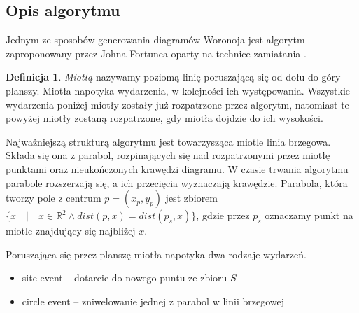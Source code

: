 \documentclass[declaration,shortabstract, inz]{iithesis}
\theoremstyle{definition} \newtheorem{definition}{Definicja}[]
\theoremstyle{plain} \newtheorem{remark}[definition]{Obserwacja}
\theoremstyle{plain} \newtheorem{theorem}[definition]{Twierdzenie}
\theoremstyle{plain} \newtheorem{example}{Przykład}[definition]
\theoremstyle{plain} \newtheorem{lemma}[definition]{Lemat}
\begin{document}
\subsection{Opis algorytmu}
Jednym ze sposobów  generowania diagramów Woronoja jest algorytm zaproponowany przez Johna Fortunea oparty na technice zamiatania \cite{miotla}. 

\begin{definition}
\textit{Miotłą} nazywamy poziomą linię poruszającą się od dołu do góry planszy. Miotła napotyka wydarzenia, w kolejności ich występowania. Wszystkie wydarzenia poniżej miotły zostały już rozpatrzone przez algorytm, natomiast te powyżej miotły zostaną rozpatrzone, gdy miotła dojdzie do ich wysokości.
\end{definition}

Najważniejszą strukturą algorytmu jest towarzysząca miotle linia brzegowa. Składa się ona z parabol, rozpinających się nad rozpatrzonymi przez miotłę punktami oraz nieukończonych krawędzi diagramu. W czasie trwania algorytmu parabole rozszerzają się, a ich przecięcia wyznaczają krawędzie. Parabola, która tworzy pole z centrum $p = (x_p, y_p)$ jest zbiorem $\{ x \quad | \quad x \in \mathbb{R}^2 \land dist(p, x) = dist(p_s, x) \}$, gdzie przez $p_s$ oznaczamy punkt na miotle znajdujący się najbliżej $x$. 

Poruszająca się przez planszę miotła napotyka dwa rodzaje wydarzeń.

\begin{itemize}
	\item site event -- dotarcie do nowego puntu ze zbioru $S$
	\item circle event -- zniwelowanie jednej z parabol w linii brzegowej
\end{itemize}
\end{document}
